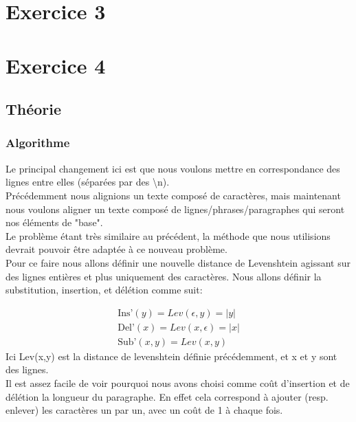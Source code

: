 \documentclass{article}
\begin{document}
\section{Exercice 3}


\section{Exercice 4}
\subsection{Théorie}
\subsubsection{Algorithme}
Le principal changement ici est que nous voulons mettre en correspondance des
lignes entre elles (séparées par des \textbackslash{}n).\\
Précédemment nous alignions un texte composé de caractères, mais maintenant nous
voulons aligner un texte composé de lignes/phrases/paragraphes qui seront nos
éléments de "base".\\

Le problème étant très similaire au précédent, la méthode que nous utilisions
devrait pouvoir être adaptée à ce nouveau problème.\\
Pour ce faire nous allons définir une nouvelle distance de Levenshtein agissant sur
des lignes entières et plus uniquement des caractères.
Nous allons définir la substitution, insertion, et délétion comme suit:

\begin{gather*}
	\text{Ins'}(y) = Lev(\epsilon,y) = \lvert y \rvert\\
	\text{Del'}(x) = Lev(x,\epsilon) = \lvert x \rvert\\
	\text{Sub'}(x,y) = Lev(x,y)
\end{gather*}
Ici Lev(x,y) est la distance de levenshtein définie précédemment, et x et y
sont des lignes.\\

Il est assez facile de voir pourquoi nous avons choisi comme coût d'insertion
et de délétion la longueur du paragraphe. En effet cela correspond à ajouter
(resp. enlever) les caractères un par un, avec un coût de 1 à chaque fois.\\
\end{document}
